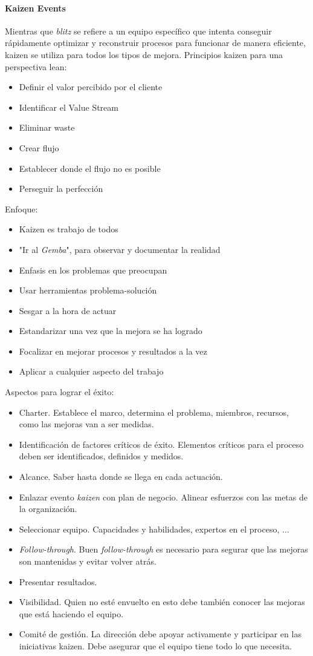 \documentclass[]{article}
\begin{document}
\paragraph{Kaizen Events}
Mientras que \textit{blitz} se refiere a un equipo específico que intenta conseguir rápidamente optimizar y reconstruir procesos para funcionar de manera eficiente, kaizen se utiliza para todos los tipos de mejora. Principios kaizen para una perspectiva lean:
\begin{itemize}
	\item Definir el valor percibido por el cliente
	\item Identificar el Value Stream
	\item Eliminar waste
	\item Crear flujo
	\item Establecer donde el flujo no es posible
	\item Perseguir la perfección
\end{itemize}
Enfoque:
\begin{itemize}
	\item Kaizen es trabajo de todos
	\item "Ir al \textit{Gemba}", para observar y documentar la realidad
	\item Enfasis en los problemas que preocupan
	\item Usar herramientas problema-solución
	\item Sesgar a la hora de actuar
	\item Estandarizar una vez que la mejora se ha logrado
	\item Focalizar en mejorar procesos y resultados a la vez
	\item Aplicar a cualquier aspecto del trabajo
\end{itemize}
Aspectos para lograr el éxito:
\begin{itemize}
	\item Charter. Establece el marco, determina el problema, miembros, recursos, como las mejoras van a ser medidas.
	\item Identificación de factores críticos de éxito. Elementos críticos para el proceso deben ser identificados, definidos y medidos.
	\item Alcance. Saber hasta donde se llega en cada actuación.
	\item Enlazar evento \textit{kaizen} con plan de negocio. Alinear esfuerzos con las metas de la organización.
	\item Seleccionar equipo. Capacidades y habilidades, expertos en el proceso, ...
	\item \textit{Follow-through}. Buen \textit{follow-through} es necesario para segurar que las mejoras son mantenidas y evitar volver atrás.
	\item Presentar resultados. 
	\item Visibilidad. Quien no esté envuelto en esto debe también conocer las mejoras que está haciendo el equipo.
	\item Comité de gestión. La dirección debe apoyar activamente y participar en las iniciativas kaizen. Debe asegurar que el equipo tiene todo lo que necesita.
\end{itemize}
\end{document}
